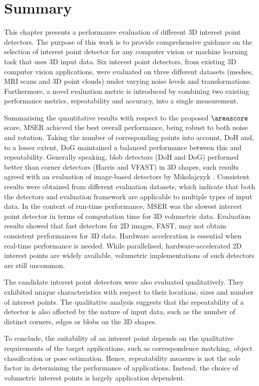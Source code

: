 


\section{Summary}
\label{sec/eval/conclusion}
This chapter presents a performanve evaluation of different 3D interest point detectors.  
The purpose of this work is to provide comprehensive guidance on the selection of interest point detector for any computer vision or machine learning task that uses 3D input data. 
Six interest point detectors, from existing 3D computer vision applications, were evaluated on three different datasets (meshes, MRI scans and 3D point clouds) under varying noise levels and transformations. 
Furthermore, a novel evaluation metric is introduced by combining two existing performance metrics, repeatability and accuracy, into a single measurement. 

Summarising the quantitative results with respect to the proposed $\areascore$ score, MSER achieved the best overall performance, being robust to both noise and rotation. Taking the number of corresponding points into account, DoH and, to a lesser extent, DoG maintained a balanced performance between this and repeatability. Generally speaking, blob detectors (\eg DoH and DoG) performed better than corner detectors (\eg Harris and VFAST) in 3D shapes, such results agreed with an evaluation of image-based detectors by Mikolajczyk \etal \cite{Mikolajczyk2005}. Consistent results were obtained from different evaluation datasets, which indicate that both the detectors and evaluation framework are applicable to multiple types of input data. In the context of run-time performance, MSER was the slowest interest point detector in terms of computation time for 3D volumetric data. Evaluation results showed that fast detectors for 2D images, \eg FAST, may not obtain consistent performances for 3D data. Hardware acceleration is essential when real-time performance is needed. While parallelised, hardware-accelerated 2D interest points are widely available, volumetric implementations of such detectors are still uncommon. 

The candidate interest point detectors were also evaluated qualitatively. 
They exhibited unique characteristics with respect to their locations, sizes and number of interest points. 
The qualitative analysis suggests that the repeatability of a detector is also affected by the nature of input data, such as the number of distinct corners, edges or blobs on the 3D shapes. 

To conclude, the suitability of an interest point depends on the qualitative requirements of the target applications, such as correspondence matching, object classification or pose estimation. Hence, repeatability measure is not the sole factor in determining the performance of applications. Instead, the choice of volumetric interest points is largely application dependent. 
